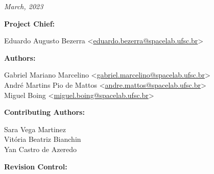 %
%
%
%
%

%
%
%
%
%

\thispagestyle{empty}

\begin{center}

\textbf{\thetitle}

\textit{March, 2023}

\vspace{1cm}

\textbf{Project Chief:}

Eduardo Augusto Bezerra <\href{mailto:eduardo.bezerra@spacelab.ufsc.br}{eduardo.bezerra@spacelab.ufsc.br}>

\vspace{1cm}

\textbf{Authors:}

Gabriel Mariano Marcelino <\href{mailto:gabriel.marcelino@spacelab.ufsc.br}{gabriel.marcelino@spacelab.ufsc.br}> \\
André Martins Pio de Mattos <\href{mailto:andre.mattos@spacelab.ufsc.br}{andre.mattos@spacelab.ufsc.br}> \\
Miguel Boing <\href{mailto:miguel.boing@spacelab.ufsc.br}{miguel.boing@spacelab.ufsc.br}> \\

\vspace{1cm}

\textbf{Contributing Authors:}

Sara Vega Martinez \\
Vitória Beatriz Bianchin \\
Yan Castro de Azeredo \\

\vspace{1cm}

\textbf{Revision Control:}

\end{center}

